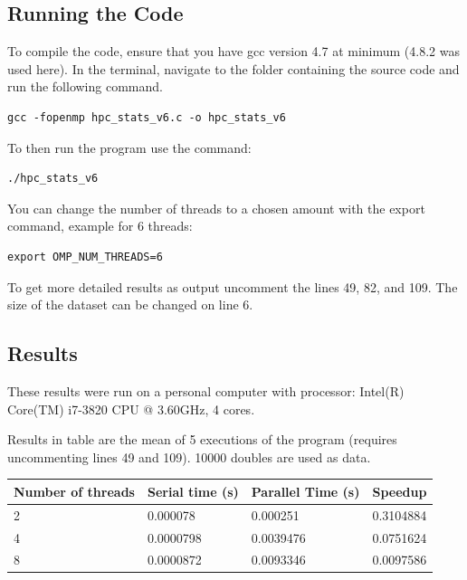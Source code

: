 \documentclass[11pt]{article}
\begin{document}
\newpage

\subsection{Running the Code}

To compile the code, ensure that you have gcc version 4.7 at minimum (4.8.2 was used here). In the terminal, navigate to the folder containing the source code and run the following command.

\begin{lstlisting}
gcc -fopenmp hpc_stats_v6.c -o hpc_stats_v6
\end{lstlisting}
To then run the program use the command:
\begin{lstlisting}
./hpc_stats_v6
\end{lstlisting}
You can change the number of threads to a chosen amount with the export command, example for 6 threads:
\begin{lstlisting}
export OMP_NUM_THREADS=6
\end{lstlisting}

To get more detailed results as output uncomment the lines 49, 82, and 109.
The size of the dataset can be changed on line 6.

\subsection{Results}
These results were run on a personal computer with processor: Intel(R) Core(TM) i7-3820 CPU @ 3.60GHz, 4 cores.

Results in table are the mean of 5 executions of the program (requires uncommenting lines 49 and 109). 10000 doubles are used as data.

\begin{table}[h]
\begin{tabular}{|l|l|l|l|}
\hline
\textbf{Number of threads} & \textbf{Serial time (s)} & \textbf{Parallel Time (s)} & \textbf{Speedup} \\ \hline
2                          & 0.000078                 & 0.000251                   & 0.3104884        \\ \hline
4                          & 0.0000798                & 0.0039476                  & 0.0751624        \\ \hline
8                          & 0.0000872                & 0.0093346                  & 0.0097586        \\ \hline
\end{tabular}
\end{table}
\end{document}
